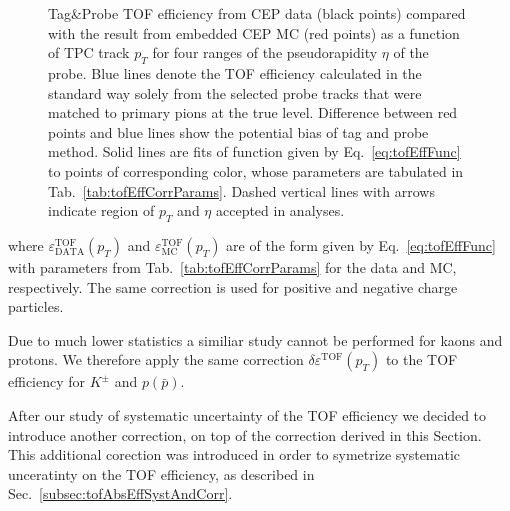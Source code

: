 \begin{figure}[H]
{\begin{subfigure}[b]{\linewidth}
  \end{subfigure}
}%
\caption[Tag\&Probe TOF efficiency from CEP data compared with the result from embedded CEP MC (divided w.r.t. $\eta$ of the probe).]%
    {Tag\&Probe TOF efficiency from CEP data (black points) compared with the result from embedded CEP MC (red points) as a function of TPC track $p_{T}$ for four ranges of the pseudorapidity $\eta$ of the probe. Blue lines denote the TOF efficiency calculated in the standard way solely from the selected probe tracks that were matched to primary pions at the true level. Difference between red points and blue lines show the potential bias of tag and probe method. Solid lines are fits of function given by Eq.~\eqref{eq:tofEffFunc} to points of corresponding color, whose parameters are tabulated in Tab.~\ref{tab:tofEffCorrParams}. Dashed vertical lines with arrows indicate region of $p_{T}$ and $\eta$ accepted in analyses.}\label{fig:tofEffSyst_etaBins}%
\end{figure}%
%
%
%
%
\noindent where $\varepsilon^{\text{TOF}}_{\text{DATA}}(p_{T})$ and $\varepsilon^{\text{TOF}}_{\text{MC}}(p_{T})$ are of the form given by Eq.~\eqref{eq:tofEffFunc} with parameters from Tab.~\ref{tab:tofEffCorrParams} for the data and MC, respectively. The same correction is used for positive and negative charge particles.

Due to much lower statistics a similiar study cannot be performed for kaons and protons. We therefore apply the same correction $\delta\varepsilon^{\text{TOF}}(p_{T})$ to the TOF efficiency for $K^{\pm}$ and $p(\bar{p})$.

After our study of systematic uncertainty of the TOF efficiency we decided to introduce another correction, on top of the correction derived in this Section. This additional corection was introduced in order to symetrize systematic unceratinty on the TOF efficiency, as described in Sec.~\ref{subsec:tofAbsEffSystAndCorr}.
 

